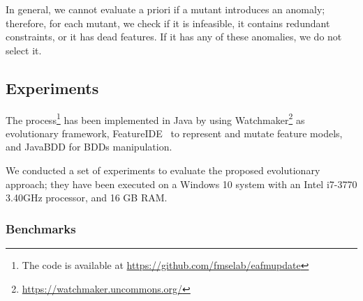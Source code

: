 \begin{tikzborder}{\cite{Gargantini16:validation}}
\begin{tikzborder}{\cite{gargantini_combinatorial_2017}}
\begin{tikzborder}{\cite{gargantini_combinatorial_2017}}
\begin{tikzborder}{\cite{garn2019}}
\begin{tikzborder}{\cite{arcaini2019achieving}}
	In general, we cannot evaluate a priori if a mutant introduces an anomaly; therefore, for each mutant, we check if it is infeasible, it contains redundant constraints, or it has dead features. If it has any of these anomalies, we do not select it.\be
	
	\subsection{Experiments}\label{sec:experiments}
	
	\bb The process\footnote{The code is available at \url{https://github.com/fmselab/eafmupdate}} has been implemented in Java by using Watchmaker\footnote{\url{https://watchmaker.uncommons.org/}} as evolutionary framework, FeatureIDE~\cite{FeatureIDEbook} to represent and mutate feature models, and JavaBDD for BDDs manipulation. 
	
	We conducted a set of experiments to evaluate the proposed evolutionary approach; they have been executed on a Windows 10 system with an Intel i7-3770 3.40GHz processor, and 16 GB RAM.\be
	
	\subsubsection{Benchmarks}\label{sec:benchmarks1}
	

\end{tikzborder}
\end{tikzborder}
\end{tikzborder}
\end{tikzborder}
\end{tikzborder}
